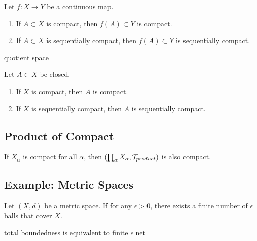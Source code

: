 \begin{theorem}
    Let $f:X\to Y$ be a continuous map.
    \begin{enumerate}[label=(\roman*)]
        \item If $A\subset X$ is compact, then $f(A)\subset Y$ is compact.
        \item If $A\subset X$ is sequentially compact, then $f(A)\subset Y$ is sequentially compact.
    \end{enumerate}
\end{theorem}
\begin{corollary}
    quotient space
\end{corollary}

\begin{theorem}
    Let $A\subset X$ be closed.
    \begin{enumerate}[label=(\roman*)]
        \item If $X$ is compact, then $A$ is compact.
        \item If $X$ is sequentially compact, then $A$ is sequentially compact.
    \end{enumerate}
\end{theorem}


\subsection{Product of Compact}

\begin{theorem}[Tychonoff]
    If $X_\alpha$ is compact for all $\alpha$, then $(\prod_{\alpha}X_{\alpha},\mathcal{T}_{product})$ is also compact.
\end{theorem}

\subsection{Example: Metric Spaces}

\begin{definition}
    Let $(X,d)$ be a metric space. If for any $\epsilon>0$, there exists a finite number of $\epsilon$ balls that cover $X$.
\end{definition}

\begin{definition}
    
\end{definition}

\begin{proposition}
    total boundedness is equivalent to finite $\epsilon$ net
\end{proposition}



